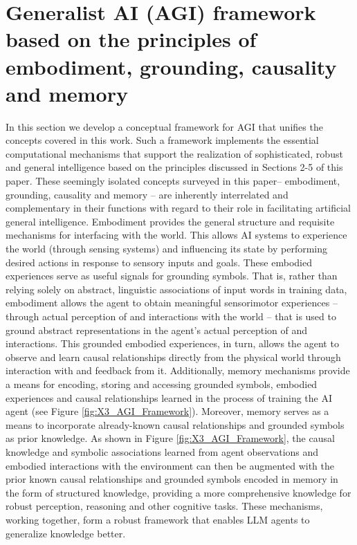 \documentclass[10pt,journal,compsoc]{IEEEtran}
\begin{document}
	\section{Generalist AI (AGI) framework based on the principles of embodiment, grounding, causality and memory}
	In this section we develop a conceptual framework for AGI that unifies the concepts covered in this work. Such a framework implements the essential computational mechanisms that support the realization of sophisticated, robust and general intelligence based on the principles discussed in Sections 2-5 of this paper. These seemingly isolated concepts surveyed in this paper– embodiment, grounding, causality and memory – are inherently interrelated and complementary in their functions with regard to their role in facilitating artificial general intelligence. 
	Embodiment provides the general structure and requisite mechanisms for interfacing with the world. This allows AI systems to experience the world (through sensing systems) and influencing its state by performing desired actions in response to sensory inputs and goals. These embodied experiences serve as useful signals for grounding symbols. That is, rather than relying solely on abstract, linguistic associations of input words in training data, embodiment allows the agent to obtain meaningful sensorimotor experiences – through actual perception of and interactions with the world – that is used to ground abstract representations in the agent’s actual perception of and interactions. This grounded embodied experiences, in turn, allows the agent to observe and learn causal relationships directly from the physical world through interaction with and feedback from it. Additionally, memory mechanisms provide a means for encoding, storing and accessing grounded symbols, embodied experiences and causal relationships learned in the process of training the AI agent (see Figure \ref{fig:X3_AGI_Framework}).  Moreover, memory serves as a means to incorporate already-known causal relationships and grounded symbols as prior knowledge. As shown in Figure \ref{fig:X3_AGI_Framework}, the causal knowledge and symbolic associations learned from agent observations and embodied interactions with the environment can then be augmented with the prior known causal relationships and grounded symbols encoded in memory in the form of structured knowledge, providing a more comprehensive knowledge for robust perception, reasoning and other cognitive tasks.  These mechanisms, working together, form a robust framework that enables LLM agents to generalize knowledge better.
	
\end{document}
